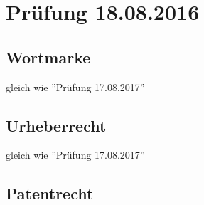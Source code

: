\section{Prüfung 18.08.2016}

\subsection{Wortmarke}
gleich wie ''Prüfung 17.08.2017''

\subsection{Urheberrecht}
gleich wie ''Prüfung 17.08.2017''

\subsection{Patentrecht}
